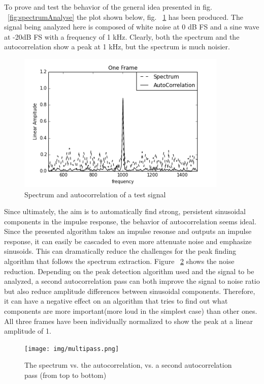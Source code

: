 To prove and test the behavior of the general idea presented in fig. ~\ref{fig:spectrumAnalyse} the plot shown below, fig. ~\ref{fig:specVsCorr} has been produced. The signal being analyzed here is composed of white noise at 0 dB FS and a sine wave at -20dB FS with a frequency of 1 kHz. Clearly, both the spectrum and the autocorrelation show a peak at 1 kHz, but the spectrum is much noisier.

\begin{figure}[h]
	\begin{center}
		\includegraphics[width = 10cm]{img/specVsCorr.png}
		\caption{Spectrum and autocorrelation of a test signal}
		\label{fig:specVsCorr}
	\end{center}
\end{figure}

Since ultimately, the aim is to automatically find strong, persistent sinusoidal components in the impulse response, the behavior of autocorrelation seems ideal. Since the presented algorithm takes an impulse resonse and outputs an impulse response, it can easily be cascaded to even more attenuate noise and emphasize sinusoids. This can dramatically reduce the challenges for the peak finding algorithm that follows the spectrum extraction. Figure ~\ref{fig:multipassCorr} shows the noise reduction. Depending on the peak detection algorithm used and the signal to be analyzed, a second autocorrelation pass can both improve the signal to noise ratio but also reduce amplitude differences between sinusoidal components. Therefore, it can have a negative effect on an algorithm that tries to find out what components are more important(more loud in the simplest case) than other ones. All three frames have been individually normalized to show the peak at a linear amplitude of 1.    

\begin{figure}[h]
	\begin{center}
		\texttt{[image: img/multipass.png]}
		\caption{The spectrum vs. the autocorrelation, vs. a second autocorrelation pass (from top to bottom)}
		\label{fig:multipassCorr}
	\end{center}
\end{figure}

